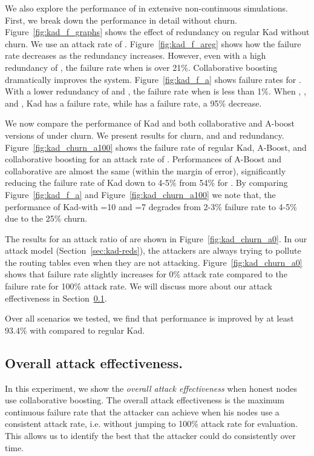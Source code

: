  We also explore the performance of \ksys in
extensive non-continuous simulations. First, we break down the
performance in detail without churn. Figure~\ref{fig:kad_f_graphs} shows
the effect of redundancy on regular Kad without churn.
We use an attack rate of . Figure~\ref{fig:kad_f_areg} shows how
the failure rate decreases as the redundancy increases. However, even
with a high redundancy of , the failure rate when  is
over 21\%. Collaborative boosting dramatically improves the
system. Figure~\ref{fig:kad_f_a} shows failure rates for \ksys. With a
lower redundancy of  and , the failure rate when
 is less than 1\%. When , , and , Kad
has a  failure rate, while \ksys has a  failure rate, a 95\%
decrease.



 We now compare the performance of
Kad and both collaborative and A-boost versions of \ksys under churn. 
We present results for  churn, and  and 
redundancy. Figure~\ref{fig:kad_churn_a100} shows the failure rate of
regular Kad, A-Boost, and collaborative boosting for an attack rate of
. Performances of A-Boost and collaborative are almost the same
(within the margin of error), significantly reducing the failure rate
of Kad down to 4-5\% from 54\% for . By comparing
Figure~\ref{fig:kad_f_a} and Figure~\ref{fig:kad_churn_a100} we note
that, the performance of Kad-\sys with =10 and =7 degrades
from 2-3\% failure rate to 4-5\% due to the 25\% churn. 


The results for an attack ratio of  are shown in
Figure~\ref{fig:kad_churn_a0}. In our attack model
(Section~\ref{sec:kad-reds}), the attackers are always trying to
pollute the routing tables even when they are not attacking.
Figure~\ref{fig:kad_churn_a0} shows that failure rate slightly increases
for 0\% attack rate compared to the failure rate for 100\% attack
rate. We will discuss more about our attack effectiveness in
Section~\ref{sec:overall_effectiveness}.


Over all scenarios we tested, we find that performance is improved by at
least 93.4\% with \ksys compared to regular Kad.





\subsection{Overall attack effectiveness.}
\label{sec:overall_effectiveness}
In this experiment, we show the \emph{overall attack effectiveness} when
honest nodes use 
collaborative boosting. The overall attack effectiveness is the maximum
continuous failure rate that the attacker can achieve when his nodes use
a consistent attack rate, i.e. without jumping to 100\% attack rate for
evaluation. This allows us to identify the best that the attacker could
do consistently over time.


